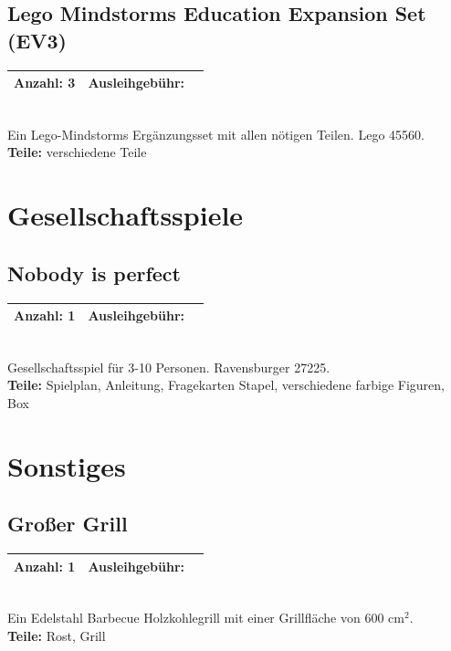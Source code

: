 \documentclass[a4paper]{article}
\newcommand{\infobox}[3] %
        {\par
                \begin{tabular}{| c | c | c| }
                \hline
                Anzahl: #1 & Ausleihgebühr: \EUR{#2}   \\
                \hline
                \end{tabular} \\
        }
\begin{document}
\subsection{Lego Mindstorms Education Expansion Set (EV3)}
\infobox{3}{0}{Neu}
Ein Lego-Mindstorms Ergänzungsset mit allen nötigen Teilen. Lego 45560. \\
\textbf{Teile:} verschiedene Teile





\section{Gesellschaftsspiele}

\subsection{Nobody is perfect}
\infobox{1}{0}{Neu}
Gesellschaftsspiel für 3-10 Personen. Ravensburger 27225. \\
\textbf{Teile:} Spielplan, Anleitung, Fragekarten Stapel, verschiedene farbige Figuren, Box


\section{Sonstiges}

\subsection{Großer Grill}
\infobox{1}{10}{Neu}
Ein Edelstahl Barbecue Holzkohlegrill mit einer Grillfläche von 600 cm$^2$. \\
\textbf{Teile:} Rost, Grill
\end{document}
